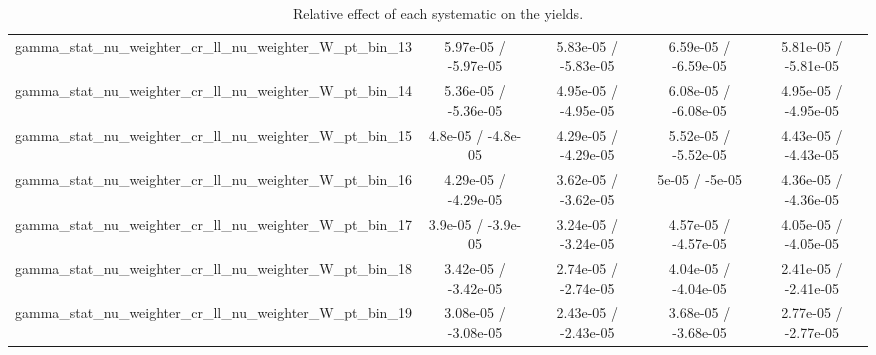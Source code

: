 \documentclass[10pt]{article}
\begin{document}
\begin{table}[htbp]
\begin{center}
\begin{tabular}{|c|c|c|c|c|}
  gamma_stat_nu_weighter_cr_ll_nu_weighter_W_pt_bin_13 & 5.97e-05 / -5.97e-05 & 5.83e-05 / -5.83e-05 & 6.59e-05 / -6.59e-05 & 5.81e-05 / -5.81e-05 \\ 
  gamma_stat_nu_weighter_cr_ll_nu_weighter_W_pt_bin_14 & 5.36e-05 / -5.36e-05 & 4.95e-05 / -4.95e-05 & 6.08e-05 / -6.08e-05 & 4.95e-05 / -4.95e-05 \\ 
  gamma_stat_nu_weighter_cr_ll_nu_weighter_W_pt_bin_15 & 4.8e-05 / -4.8e-05 & 4.29e-05 / -4.29e-05 & 5.52e-05 / -5.52e-05 & 4.43e-05 / -4.43e-05 \\ 
  gamma_stat_nu_weighter_cr_ll_nu_weighter_W_pt_bin_16 & 4.29e-05 / -4.29e-05 & 3.62e-05 / -3.62e-05 & 5e-05 / -5e-05 & 4.36e-05 / -4.36e-05 \\ 
  gamma_stat_nu_weighter_cr_ll_nu_weighter_W_pt_bin_17 & 3.9e-05 / -3.9e-05 & 3.24e-05 / -3.24e-05 & 4.57e-05 / -4.57e-05 & 4.05e-05 / -4.05e-05 \\ 
  gamma_stat_nu_weighter_cr_ll_nu_weighter_W_pt_bin_18 & 3.42e-05 / -3.42e-05 & 2.74e-05 / -2.74e-05 & 4.04e-05 / -4.04e-05 & 2.41e-05 / -2.41e-05 \\ 
  gamma_stat_nu_weighter_cr_ll_nu_weighter_W_pt_bin_19 & 3.08e-05 / -3.08e-05 & 2.43e-05 / -2.43e-05 & 3.68e-05 / -3.68e-05 & 2.77e-05 / -2.77e-05 \\ 
\hline 
\end{tabular} 
\caption{Relative effect of each systematic on the yields.} 
\end{center} 
\end{table} 
\end{document}
